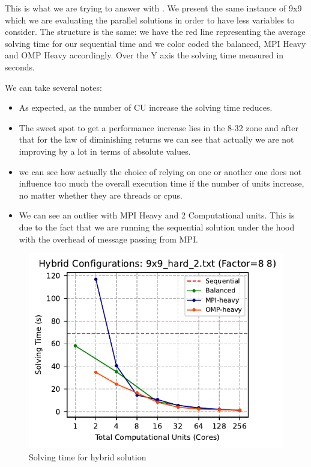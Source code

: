 This is what we are trying to answer with . We present the same instance of 9x9 which we are evaluating the parallel solutions in order to have less variables to consider. The structure is the same: we have the red line representing the average solving time for our sequential time and we color coded the balanced, MPI Heavy and OMP Heavy accordingly. Over the Y axis the solving time measured in seconds.

We can take several notes:
\begin{itemize}
    \item As expected, as the number of CU increase the solving time reduces.
    \item The sweet spot to get a performance increase lies in the 8-32 zone and after that for the law of diminishing returns we can see that actually we are not improving by a lot in terms of absolute values.
    \item we can see how actually the choice of relying on one or another one does not influence too much the overall execution time if the number of units increase, no matter whether they are threads or cpus.
    \item We can see an outlier with MPI Heavy and 2 Computational units. This is due to the fact that we are running the sequential solution under the hood with the overhead of message passing from MPI.
\end{itemize}

\begin{figure}[htbp]
\centering
\includegraphics[width=0.9\linewidth]{imgs/solving_time_hybrid_9x9_hard_2.pdf}
\caption{Solving time for hybrid solution}
\label{fig:solving_time_hybrid_9x9}
\end{figure}


